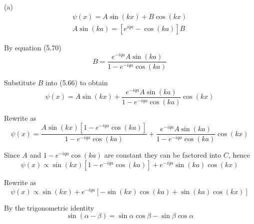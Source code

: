 


(a)
\begin{gather*}
\psi(x)=A\sin(kx)+B\cos(kx)\tag{5.66}
\\
A\sin(ka)=\left[e^{iqa}-\cos(ka)\right]B\tag{5.70}
\end{gather*}

By equation (5.70)
\begin{equation*}
B=\frac{e^{-iqa}A\sin(ka)}{1-e^{-iqa}\cos(ka)}
\end{equation*}

Substitute $B$ into (5.66) to obtain
\begin{equation*}
\psi(x)=A\sin(kx)+\frac{e^{-iqa}A\sin(ka)}{1-e^{-iqa}\cos(ka)}\cos(kx)
\end{equation*}

Rewrite as
\begin{equation*}
\psi(x)=\frac{A\sin(kx)[1-e^{-iqa}\cos(ka)]}{1-e^{-iqa}\cos(ka)}
+\frac{e^{-iqa}A\sin(ka)}{1-e^{-iqa}\cos(ka)}\cos(kx)
\end{equation*}

Since $A$ and $1-e^{-iqa}\cos(ka)$ are constant they can be factored into $C$, hence
\begin{equation*}
\psi(x)\propto\sin(kx)[1-e^{-iqa}\cos(ka)]
+e^{-iqa}\sin(ka)\cos(kx)
\end{equation*}

Rewrite as
\begin{equation*}
\psi(x)\propto\sin(kx)+e^{-iqa}[-\sin(kx)\cos(ka)+\sin(ka)\cos(kx)]
\end{equation*}

By the trigonometric identity
\begin{equation*}
\sin(\alpha-\beta)=\sin\alpha\cos\beta-\sin\beta\cos\alpha
\end{equation*}

